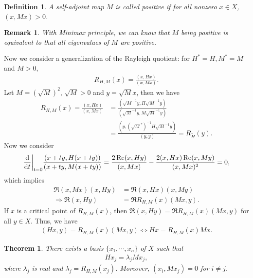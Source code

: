 \documentclass[11pt]{book}
\newtheorem{definition}{Definition}[section]
\newtheorem{theorem}{Theorem}[section]
\newtheorem{remark}{Remark}[section]
\theoremstyle{definition}
\numberwithin{equation}{subsection}
\begin{document}
\begin{definition}
A self-adjoint map $M$ is called positive if for all nonzero $x\in X$, $(x, Mx) > 0$.
\end{definition}

\begin{remark}
With Minimax principle, we can know that $M$ being positive is equivalent to that all eigenvalues of $M$ are positive.
\end{remark}

Now we consider a generalization of the Rayleigh quotient: for $H^* = H, M^* = M$ and $M > 0$, 
\begin{align*}
    R_{H,M}(x) = \frac{(x,Hx)}{(x,Mx)}.
\end{align*}
Let $M = \left(\sqrt{M}\right)^2$, $\sqrt{M} > 0$ and $y = \sqrt{M} x$, then we have
\begin{align*}
    R_{H,M}(x) = \frac{(x,Hx)}{(x,Mx)} & = \frac{\left(\sqrt{M}^{-1}y, H\sqrt{M}^{-1}y\right)}{\left(\sqrt{M}^{-1}y, M\sqrt{M}^{-1}y\right)} \\
    & = \frac{\left(y,\left(\sqrt{M}^*\right)^{-1}H \sqrt{M}^{-1} y \right)}{(y,y)} = R_{\widetilde{H}}(y).
\end{align*}
Now we consider
\begin{align*}
    \dv{}{t}\bigg|_{t = 0} \frac{\left(x+ty,H(x+ty)\right)}{\left(x+ty,M(x+ty)\right)} = \frac{2\Re(x,Hy)}{(x,Mx)} - \frac{2(x,Hx)\Re(x,My)}{(x,Mx)^2} = 0,
\end{align*}
which implies 
\begin{align*}
    \Re(x,Mx)(x,Hy) & = \Re(x,Hx)(x,My) \\
    \Rightarrow \Re(x,Hy) & = \Re R_{H,M}(x) (Mx,y).
\end{align*}
If $x$ is a critical point of $R_{H,M}(x)$, then $\Re(x,Hy)  = \Re R_{H,M}(x) (Mx,y)$ for all $y\in X$. Thus, we have
\begin{align*}
    (Hx, y) = R_{H,M}(x) (Mx,y) \iff Hx = R_{H,M}(x) Mx.
\end{align*}

\medskip

\begin{theorem}
There exists a basis $\{x_1,\cdots,x_n\}$ of $X$ such that 
\begin{align*}
    Hx_j = \lambda_j M x_j, 
\end{align*}
where $\lambda_j$ is real and $\lambda_j = R_{H,M}(x_j)$. Moreover, $\left(x_i, Mx_j\right) = 0$ for $i\neq j$.
\end{theorem}
\end{document}
